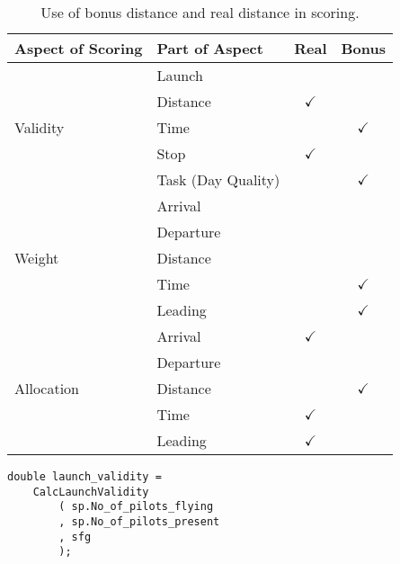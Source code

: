 \documentclass[gap.tex]{subfiles}
\begin{document}
\begin{table}[!ht]
    \begin{tabularx}{\textwidth}{|l|X|c|c|}
    \hline
        \textbf{Aspect of Scoring}
        & \textbf{Part of Aspect}
        & \textbf{Real}
        & \textbf{Bonus}
        \\
    \hline
        \multirow{5}{*}{Validity}
        & Launch
        &
        &
        \\
    \cline{2-4}
        & Distance
        & $\checkmark$
        &
        \\
    \cline{2-4}
        & Time
        &
        & $\checkmark$
        \\
    \cline{2-4}
        & Stop
        & $\checkmark$
        &
        \\
    \cline{2-4}
        & Task (Day Quality)
        &
        & $\checkmark$
        \\
    \hline
        \multirow{5}{*}{Weight}
        & Arrival
        &
        &
        \\
    \cline{2-4}
        & Departure
        &
        &
        \\
    \cline{2-4}
        & Distance
        &
        &
        \\
    \cline{2-4}
        & Time
        &
        & $\checkmark$
        \\
    \cline{2-4}
        & Leading
        &
        & $\checkmark$
        \\
    \hline
        \multirow{5}{*}{Allocation}
        & Arrival
        & $\checkmark$
        &
        \\
    \cline{2-4}
        & Departure
        &
        &
        \\
    \cline{2-4}
        & Distance
        &
        & $\checkmark$
        \\
    \cline{2-4}
        & Time
        & $\checkmark$
        &
        \\
    \cline{2-4}
        & Leading
        & $\checkmark$
        &
        \\
    \hline
    \end{tabularx}
    \caption{Use of bonus distance and real distance in scoring.}
    \label{tab:gap-defaults}
\end{table}

\begin{lstlisting}[style=base, caption={Launch validity doesn't depend on distance inputs.}]
double launch_validity =
    CalcLaunchValidity
        ( sp.No_of_pilots_flying
        , sp.No_of_pilots_present
        , sfg
        );
\end{lstlisting}
\end{document}
